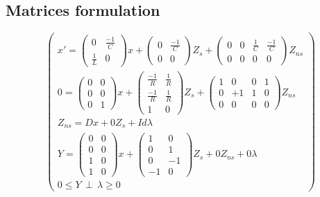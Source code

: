 \subsection{Matrices formulation}
\[
\left(\begin{array}{c}
  
x'=\left(\begin{array}{cc}
0 &\frac{-1}{C}\\
\frac{1}{L}&0\end{array} \right)x
+\left(\begin{array}{cc}
0&\frac{-1}{C}\\
0&0\end{array} \right)Z_{s}
+\left(\begin{array}{cccc}
0&0&\frac{1}{C}&\frac{-1}{C}\\
0&0&0&0\end{array} \right)Z_{ns}
\\
0=\left(\begin{array}{cc}
0 &0\\
0 &0\\
0 &1\end{array} \right)x
+\left(\begin{array}{cc}
\frac{-1}{R}&\frac{1}{R}\\
\frac{-1}{R}&\frac{1}{R}\\
1&0\end{array} \right)Z_{s}
+\left(\begin{array}{cccc}
1&0&0&1\\
0&+1&1&0\\
0&0&0&0\end{array} \right)Z_{ns}
\\
Z_{ns}=Dx+0Z_{s}+Id\lambda\\
Y=\left(\begin{array}{cc}
0&0\\
0&0\\
1&0\\
1&0\end{array}\right) x+
\left(\begin{array}{cc}
1&0\\
0&1\\
0&-1\\
-1&0\end{array}
\right) Z_{s} + 0Z_{ns} +0\lambda\\

0 \leq Y \, \perp \, \lambda \geq 0

\end{array}
\right)
\]


